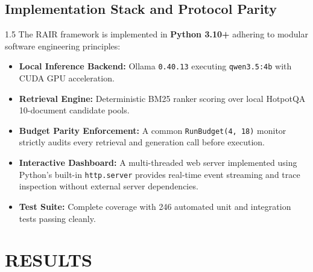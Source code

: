 \documentclass[12pt,a4paper]{report}
\begin{document}
\section{Implementation Stack and Protocol Parity}
\begin{spacing}{1.5}
The RAIR framework is implemented in \textbf{Python 3.10+} adhering to modular software engineering principles:
\begin{itemize}
    \item \textbf{Local Inference Backend:} Ollama \texttt{0.40.13} executing \texttt{qwen3.5:4b} with CUDA GPU acceleration.
    \item \textbf{Retrieval Engine:} Deterministic BM25 ranker scoring over local HotpotQA 10-document candidate pools.
    \item \textbf{Budget Parity Enforcement:} A common \texttt{RunBudget(4, 18)} monitor strictly audits every retrieval and generation call before execution.
    \item \textbf{Interactive Dashboard:} A multi-threaded web server implemented using Python's built-in \texttt{http.server} provides real-time event streaming and trace inspection without external server dependencies.
    \item \textbf{Test Suite:} Complete coverage with 246 automated unit and integration tests passing cleanly.
\end{itemize}
\end{spacing}

\chapter{RESULTS}
\end{document}
